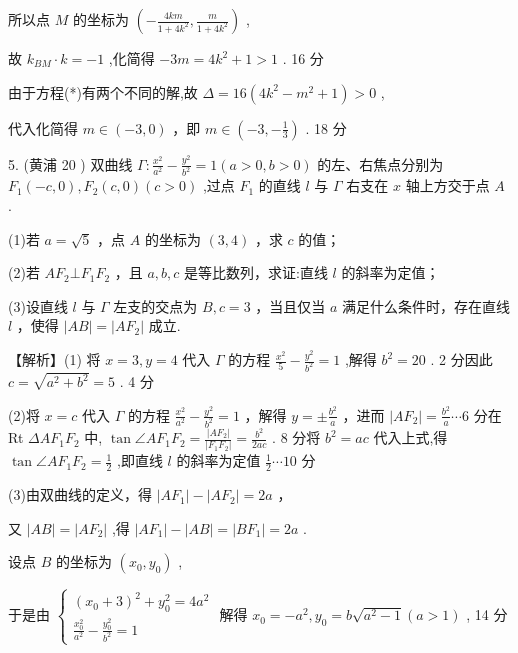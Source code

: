 \documentclass[10pt]{article}
\begin{document}
所以点 \(M\) 的坐标为 \(\left( {-\frac{4km}{1 + 4{k}^{2}},\frac{m}{1 + 4{k}^{2}}}\right)\) ,

故 \({k}_{BM} \cdot  k =  - 1\) ,化简得 \(- {3m} = 4{k}^{2} + 1 > 1\) . 16 分

由于方程(*)有两个不同的解,故 \(\Delta  = {16}\left( {4{k}^{2} - {m}^{2} + 1}\right)  > 0\) ,

代入化简得 \(m \in  \left( {-3,0}\right)\) ，即 \(m \in  \left( {-3, - \frac{1}{3}}\right)\) . 18 分

5. (黄浦 20 ) 双曲线 \(\Gamma  : \frac{{x}^{2}}{{a}^{2}} - \frac{{y}^{2}}{{b}^{2}} = 1\left( {a > 0,b > 0}\right)\) 的左、右焦点分别为 \({F}_{1}\left( {-c,0}\right) ,{F}_{2}\left( {c,0}\right) \left( {c > 0}\right)\) ,过点 \({F}_{1}\) 的直线 \(l\) 与 \(\Gamma\) 右支在 \(x\) 轴上方交于点 \(A\) .

(1)若 \(a = \sqrt{5}\) ，点 \(A\) 的坐标为 \(\left( {3,4}\right)\) ，求 \(c\) 的值；

(2)若 \(A{F}_{2} \bot  {F}_{1}{F}_{2}\) ，且 \(a,b,c\) 是等比数列，求证:直线 \(l\) 的斜率为定值；

(3)设直线 \(l\) 与 \(\Gamma\) 左支的交点为 \(B,c = 3\) ，当且仅当 \(a\) 满足什么条件时，存在直线 \(l\) ，使得 \(\left| {AB}\right|  = \left| {A{F}_{2}}\right|\) 成立.

【解析】(1) 将 \(x = 3,y = 4\) 代入 \(\Gamma\) 的方程 \(\frac{{x}^{2}}{5} - \frac{{y}^{2}}{{b}^{2}} = 1\) ,解得 \({b}^{2} = {20}\) . 2 分因此 \(c = \sqrt{{a}^{2} + {b}^{2}} = 5\) . 4 分

(2)将 \(x = c\) 代入 \(\Gamma\) 的方程 \(\frac{{x}^{2}}{{a}^{2}} - \frac{{y}^{2}}{{b}^{2}} = 1\) ，解得 \(y =  \pm  \frac{{b}^{2}}{a}\) ，进而 \(\left| {A{F}_{2}}\right|  = \frac{{b}^{2}}{a}\cdots 6\) 分在 Rt \({\Delta A}{F}_{1}{F}_{2}\) 中, \(\tan \angle A{F}_{1}{F}_{2} = \frac{\left| A{F}_{2}\right| }{\left| {F}_{1}{F}_{2}\right| } = \frac{{b}^{2}}{2ac}\) . 8 分将 \({b}^{2} = {ac}\) 代入上式,得 \(\tan \angle A{F}_{1}{F}_{2} = \frac{1}{2}\) ,即直线 \(l\) 的斜率为定值 \(\frac{1}{2}\cdots {10}\) 分

(3)由双曲线的定义，得 \(\left| {A{F}_{1}}\right|  - \left| {A{F}_{2}}\right|  = {2a}\) ，

又 \(\left| {AB}\right|  = \left| {A{F}_{2}}\right|\) ,得 \(\left| {A{F}_{1}}\right|  - \left| {AB}\right|  = \left| {B{F}_{1}}\right|  = {2a}\) .

设点 \(B\) 的坐标为 \(\left( {{x}_{0},{y}_{0}}\right)\) ,

于是由 \(\left\{  \begin{array}{l} {\left( {x}_{0} + 3\right) }^{2} + {y}_{0}^{2} = 4{a}^{2} \\  \frac{{x}_{0}^{2}}{{a}^{2}} - \frac{{y}_{0}^{2}}{{b}^{2}} = 1 \end{array}\right.\) 解得 \({x}_{0} =  - {a}^{2},{y}_{0} = b\sqrt{{a}^{2} - 1}\left( {a > 1}\right)\) , 14 分
\end{document}
